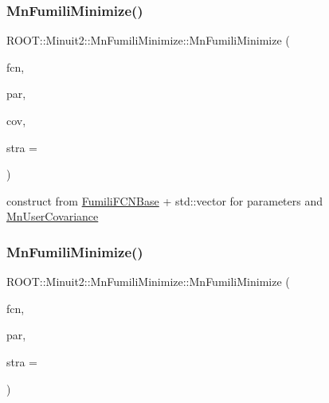 \subsubsection{\texorpdfstring{MnFumiliMinimize()}{MnFumiliMinimize()}\hspace{0.1cm}{\footnotesize\ttfamily [10/14]}}
{\footnotesize\ttfamily R\+O\+O\+T\+::\+Minuit2\+::\+Mn\+Fumili\+Minimize\+::\+Mn\+Fumili\+Minimize (\begin{DoxyParamCaption}\item[{const \mbox{\hyperlink{classROOT_1_1Minuit2_1_1FumiliFCNBase}{Fumili\+F\+C\+N\+Base}} \&}]{fcn,  }\item[{const std\+::vector$<$ double $>$ \&}]{par,  }\item[{const \mbox{\hyperlink{classROOT_1_1Minuit2_1_1MnUserCovariance}{Mn\+User\+Covariance}} \&}]{cov,  }\item[{unsigned int}]{stra = {} }\end{DoxyParamCaption})\hspace{0.3cm}{\ttfamily [inline]}}



construct from \mbox{\hyperlink{classROOT_1_1Minuit2_1_1FumiliFCNBase}{Fumili\+F\+C\+N\+Base}} + std\+::vector for parameters and \mbox{\hyperlink{classROOT_1_1Minuit2_1_1MnUserCovariance}{Mn\+User\+Covariance}} 

\mbox{\label{classROOT_1_1Minuit2_1_1MnFumiliMinimize_aec4f0adff373393b4023f3a783b7d4bd}} 
\subsubsection{\texorpdfstring{MnFumiliMinimize()}{MnFumiliMinimize()}\hspace{0.1cm}{\footnotesize\ttfamily [11/14]}}
{\footnotesize\ttfamily R\+O\+O\+T\+::\+Minuit2\+::\+Mn\+Fumili\+Minimize\+::\+Mn\+Fumili\+Minimize (\begin{DoxyParamCaption}\item[{const \mbox{\hyperlink{classROOT_1_1Minuit2_1_1FumiliFCNBase}{Fumili\+F\+C\+N\+Base}} \&}]{fcn,  }\item[{const \mbox{\hyperlink{classROOT_1_1Minuit2_1_1MnUserParameters}{Mn\+User\+Parameters}} \&}]{par,  }\item[{unsigned int}]{stra = {} }\end{DoxyParamCaption})\hspace{0.3cm}{\ttfamily [inline]}}



